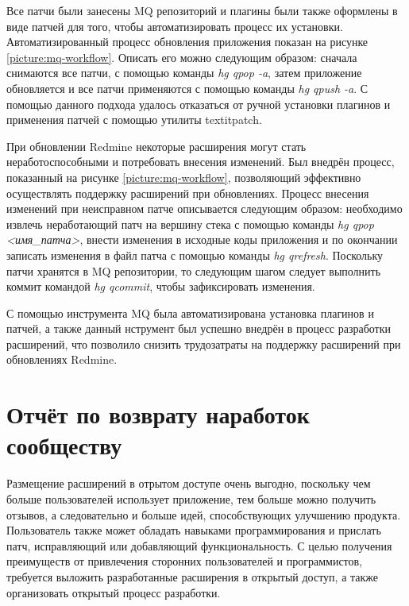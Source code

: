 Все патчи были занесены MQ репозиторий и плагины были также оформлены в виде
патчей для того, чтобы автоматизировать процесс их установки.
Автоматизированный процесс обновления приложения показан на рисунке
\ref{picture:mq-workflow}. Описать его можно следующим образом: сначала
снимаются все патчи, с помощью команды \textit{hg qpop -a}, затем приложение
обновляется и все патчи применяются с помощью команды \textit{hg qpush -a}. С
помощью данного подхода удалось отказаться от ручной установки плагинов и
применения патчей с помощью утилиты textit{patch}.

При обновлении Redmine некоторые расширения могут стать неработоспособными и
потребовать внесения изменений. Был внедрён процесс, показанный на рисунке
\ref{picture:mq-workflow}, позволяющий эффективно осуществлять поддержку
расширений при обновлениях. Процесс внесения изменений при неисправном патче
описывается следующим образом: необходимо извлечь неработающий патч на вершину
стека с помощью команды \textit{hg qpop <имя\_патча>}, внести изменения в
исходные коды приложения и по окончании записать изменения в файл патча с
помощью команды \textit{hg qrefresh}. Поскольку патчи хранятся в MQ
репозитории, то следующим шагом следует выполнить коммит командой \textit{hg
qcommit}, чтобы зафиксировать изменения.

С помощью инструмента MQ была автоматизирована установка плагинов и патчей, а
также данный нструмент был успешно внедрён в процесс разработки расширений,
что позволило снизить трудозатраты на поддержку расширений при обновлениях
Redmine.


\section{Отчёт по возврату наработок сообществу}
Размещение расширений в отрытом доступе очень выгодно, поскольку чем больше
пользователей использует приложение, тем больше можно получить отзывов, а
следовательно и больше идей, способствующих улучшению продукта.
Пользователь также может обладать навыками программирования и прислать патч,
исправляющий или добавляющий функциональность. С целью получения преимуществ от
привлечения сторонних пользователей и программистов, требуется выложить
разработанные расширения в открытый доступ, а также организовать открытый
процесс разработки.


